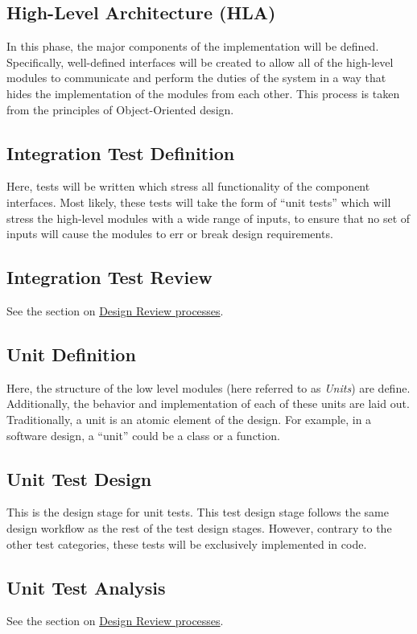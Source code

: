 \documentclass[12pt]{article}
\begin{document}
\subsection{High-Level Architecture (HLA)}
In this phase, the major components of the implementation will be defined.
Specifically, well-defined interfaces will be created to allow all of the
high-level modules to communicate and perform the duties of the system in a
way that hides the implementation of the modules from each other. This
process is taken from the principles of Object-Oriented design.

\subsection{Integration Test Definition}
Here, tests will be written which stress all functionality of the component
interfaces. Most likely, these tests will take the form of ``unit tests'' which
will stress the high-level modules with a wide range of inputs, to ensure that
no set of inputs will cause the modules to err or break design requirements.

\subsection{Integration Test Review}
See the section on \hyperref[sec:review]{Design Review processes}.

\subsection{Unit Definition}
Here, the structure of the low level modules (here referred to as {\it Units})
are define. Additionally, the behavior and implementation of each of these
units are laid out. Traditionally, a unit is an atomic element of the design.
For example, in a software design, a ``unit'' could be a class or a function.

\subsection{Unit Test Design}
This is the design stage for unit tests. This test design stage follows the
same design workflow as the rest of the test design stages. However, contrary
to the other test categories, these tests will be exclusively implemented in
code.

\subsection{Unit Test Analysis}
See the section on \hyperref[sec:review]{Design Review processes}.
\pagebreak
\end{document}
